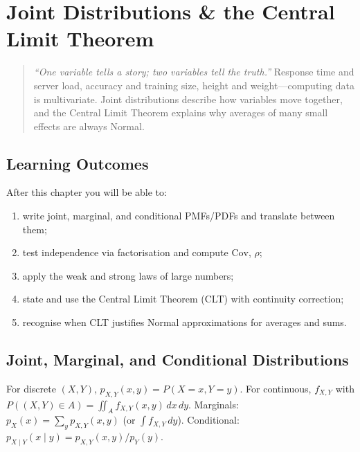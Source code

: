 \chapter{Joint Distributions \& the Central Limit Theorem}
\label{ch:joint}

\begin{quote}
\emph{``One variable tells a story; two variables tell the truth.''} Response time and server load, accuracy and training size, height and weight---computing data is multivariate. Joint distributions describe how variables move together, and the Central Limit Theorem explains why averages of many small effects are always Normal.
\end{quote}

\noindent{}
\vspace{0.4em}

\section*{Learning Outcomes}
After this chapter you will be able to:
\begin{enumerate}[label=(L\arabic*)]
    \item write joint, marginal, and conditional PMFs/PDFs and translate between them;
    \item test independence via factorisation and compute $\mathrm{Cov}$, $\rho$;
    \item apply the weak and strong laws of large numbers;
    \item state and use the Central Limit Theorem (CLT) with continuity correction;
    \item recognise when CLT justifies Normal approximations for averages and sums.
\end{enumerate}

\section{Joint, Marginal, and Conditional Distributions}
\label{sec:joint-def}

\begin{definition} For discrete $(X,Y)$, $p_{X,Y}(x,y)=P(X=x,Y=y)$. For continuous, $f_{X,Y}$ with $P((X,Y)\in A)=\iint_A f_{X,Y}(x,y)\,dx\,dy$. Marginals: $p_X(x)=\sum_y p_{X,Y}(x,y)$ (or $\int f_{X,Y}\,dy$). Conditional: $p_{X\mid Y}(x\mid y)=p_{X,Y}(x,y)/p_Y(y)$.
\end{definition}

